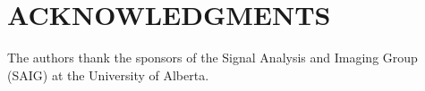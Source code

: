 \section{ACKNOWLEDGMENTS}
The authors thank the sponsors of the Signal Analysis and Imaging Group (SAIG) at the University of Alberta.







